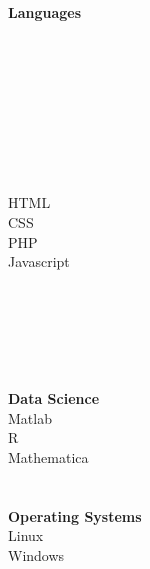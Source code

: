 \begin{multicols}{3}
[
]
\textbf{Languages} \\
 \\
 \\
 \\
 \\ \\
 \\
 \\

\columnbreak
{} \\
HTML \\
CSS\\
PHP\\
Javascript\\ \\
 \\
 \\
\\ \\
\columnbreak \\
\textbf{Data Science} \\
Matlab \\
R \\
Mathematica \\ \\ \\
\textbf{Operating Systems} \\
Linux \\
Windows
\end{multicols}